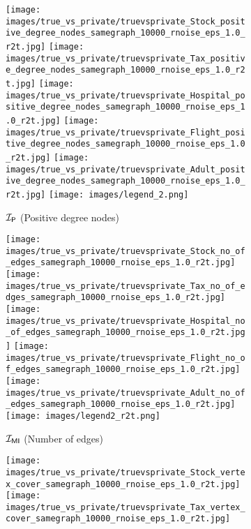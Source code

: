 \begin{figure*}
    \begin{subfigure}[b]{\textwidth}
    \centering
    \texttt{[image: images/true\_vs\_private/truevsprivate\_Stock\_positive\_degree\_nodes\_samegraph\_10000\_rnoise\_eps\_1.0\_r2t.jpg]}
    \hfill
    \texttt{[image: images/true\_vs\_private/truevsprivate\_Tax\_positive\_degree\_nodes\_samegraph\_10000\_rnoise\_eps\_1.0\_r2t.jpg]}
    \hfill
    \texttt{[image: images/true\_vs\_private/truevsprivate\_Hospital\_positive\_degree\_nodes\_samegraph\_10000\_rnoise\_eps\_1.0\_r2t.jpg]}
    \hfill
    \texttt{[image: images/true\_vs\_private/truevsprivate\_Flight\_positive\_degree\_nodes\_samegraph\_10000\_rnoise\_eps\_1.0\_r2t.jpg]}
    \hfill
    \texttt{[image: images/true\_vs\_private/truevsprivate\_Adult\_positive\_degree\_nodes\_samegraph\_10000\_rnoise\_eps\_1.0\_r2t.jpg]}
    \texttt{[image: images/legend\_2.png]}
    \caption{$\mathcal{I_\mathsf{P}}$ (Positive degree nodes)}
    \label{fig:tp_rnoise_pdedges}
    \end{subfigure}
    \begin{subfigure}[b]{\textwidth}
    \centering
    \texttt{[image: images/true\_vs\_private/truevsprivate\_Stock\_no\_of\_edges\_samegraph\_10000\_rnoise\_eps\_1.0\_r2t.jpg]}
    \hfill
    \texttt{[image: images/true\_vs\_private/truevsprivate\_Tax\_no\_of\_edges\_samegraph\_10000\_rnoise\_eps\_1.0\_r2t.jpg]}
    \hfill
    \texttt{[image: images/true\_vs\_private/truevsprivate\_Hospital\_no\_of\_edges\_samegraph\_10000\_rnoise\_eps\_1.0\_r2t.jpg]}
    \hfill
    \texttt{[image: images/true\_vs\_private/truevsprivate\_Flight\_no\_of\_edges\_samegraph\_10000\_rnoise\_eps\_1.0\_r2t.jpg]}
    \hfill
    \texttt{[image: images/true\_vs\_private/truevsprivate\_Adult\_no\_of\_edges\_samegraph\_10000\_rnoise\_eps\_1.0\_r2t.jpg]}
    \texttt{[image: images/legend2\_r2t.png]}
    \caption{$\mathcal{I_{\mathsf{MI}}}$ (Number of edges)}
    \label{fig:tp_rnoise_nedges}
    \end{subfigure}
      \begin{subfigure}[b]{\textwidth}
         \centering
         \texttt{[image: images/true\_vs\_private/truevsprivate\_Stock\_vertex\_cover\_samegraph\_10000\_rnoise\_eps\_1.0\_r2t.jpg]}
         \hfill
         \texttt{[image: images/true\_vs\_private/truevsprivate\_Tax\_vertex\_cover\_samegraph\_10000\_rnoise\_eps\_1.0\_r2t.jpg]}
         \hfill

\end{subfigure}
\end{figure*}
